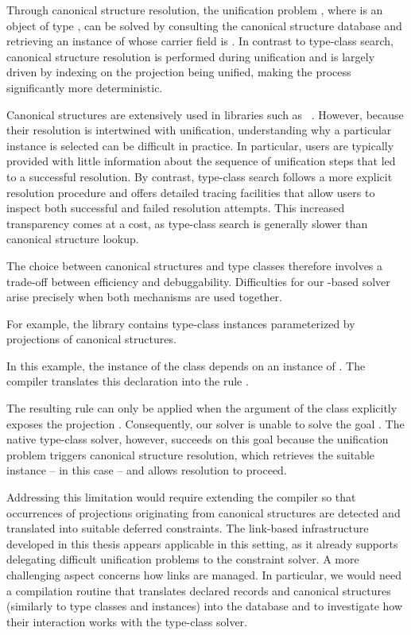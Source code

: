 

Through canonical structure resolution, the unification problem , where  is an object of type , can be solved by consulting
the canonical structure database and retrieving an instance of  whose
carrier field is . In contrast to type-class search, canonical structure
resolution is performed during unification and is largely driven by indexing on
the projection being unified, making the process significantly more
deterministic.

Canonical structures are extensively used in libraries such as \hb~\cite{hb}.
However, because their resolution is intertwined with unification, understanding
why a particular instance is selected can be difficult in practice. In
particular, users are typically provided with little information about the
sequence of unification steps that led to a successful resolution. By contrast,
type-class search follows a more explicit resolution procedure and offers
detailed tracing facilities that allow users to inspect both successful and
failed resolution attempts. This increased transparency comes at a cost, as
type-class search is generally slower than canonical structure lookup.

The choice between canonical structures and type classes therefore involves a
trade-off between efficiency and debuggability. Difficulties for our \elpi-based
solver arise precisely when both mechanisms are used together.

For example, the \iris library contains type-class instances parameterized by
projections of canonical structures.



In this example, the instance  of the class  depends on an instance
of . The \elpi compiler translates this declaration into the rule
.

The resulting rule can only be applied when the argument of the class explicitly
exposes the projection . Consequently, our solver is unable to solve the
goal . The native \rocq type-class solver, however, succeeds on this
goal because the unification problem  triggers canonical
structure resolution, which retrieves the suitable  instance --
 in this case -- and allows resolution to proceed.

Addressing this limitation would require extending the compiler so that
occurrences of projections originating from canonical structures are detected
and translated into suitable deferred constraints. The link-based infrastructure
developed in this thesis appears applicable in this setting, as it already
supports delegating difficult unification problems to the constraint solver. A
more challenging aspect concerns how links are managed. In particular, we would
need a compilation routine that translates declared records and canonical
structures (similarly to type classes and instances) into the \elpi database and
to investigate how their interaction works with the type-class solver. %

